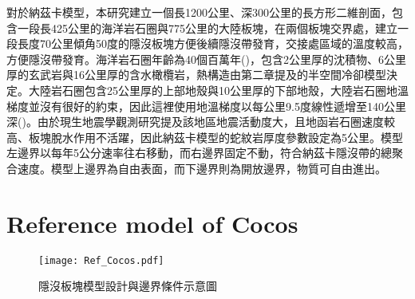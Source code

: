 對於納茲卡模型，本研究建立一個長1200公里、深300公里的長方形二維剖面，包含一段長425公里的海洋岩石圈與775公里的大陸板塊，在兩個板塊交界處，建立一段長度70公里傾角50度的隱沒板塊方便後續隱沒帶發育，交接處區域的溫度較高，方便隱沒帶發育。海洋岩石圈年齡為40個百萬年(\citealp{muller2019})，包含2公里厚的沈積物、6公里厚的玄武岩與16公里厚的含水橄欖岩，熱構造由第二章提及的半空間冷卻模型決定。大陸岩石圈包含25公里厚的上部地殼與10公里厚的下部地殼，大陸岩石圈地溫梯度並沒有很好的約束，因此這裡使用地溫梯度以每公里9.5度線性遞增至140公里深(\citealp{perez2008})。由於現生地震學觀測研究提及該地區地震活動度大，且地函岩石圈速度較高、板塊脫水作用不活躍，因此納茲卡模型的蛇紋岩厚度參數設定為5公里。模型左邊界以每年5公分速率往右移動，而右邊界固定不動，符合納茲卡隱沒帶的總聚合速度。模型上邊界為自由表面，而下邊界則為開放邊界，物質可自由進出。





\section{Reference model of Cocos}


\begin{figure*}[ht!]
    \centering
    \texttt{[image: Ref\_Cocos.pdf]}
    \caption{隱沒板塊模型設計與邊界條件示意圖}
    \label{fig::reference Cocos model}
\end{figure*}